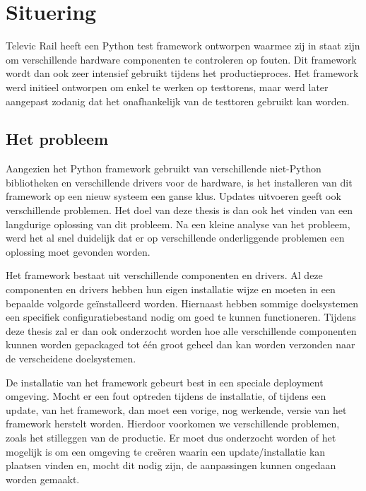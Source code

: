 \chapter{Situering}\label{hfdst:situering}
Televic Rail heeft een Python test framework ontworpen waarmee zij in staat zijn om verschillende hardware componenten te controleren op fouten.
Dit framework wordt dan ook zeer intensief gebruikt tijdens het productieproces.
Het framework werd initieel ontworpen om enkel te werken op testtorens, maar werd later aangepast zodanig dat het onafhankelijk van de testtoren gebruikt kan worden.

\section{Het probleem}\label{sec:probleem}
Aangezien het Python framework gebruikt van verschillende niet-Python bibliotheken en verschillende drivers voor de hardware, is het installeren van dit framework op een nieuw systeem een ganse klus.
Updates uitvoeren geeft ook verschillende problemen.
Het doel van deze thesis is dan ook het vinden van een langdurige oplossing van dit probleem.
Na een kleine analyse van het probleem, werd het al snel duidelijk dat er op verschillende onderliggende problemen een oplossing moet gevonden worden.

Het framework bestaat uit verschillende componenten en drivers.
Al deze componenten en drivers hebben hun eigen installatie wijze en moeten in een bepaalde volgorde geïnstalleerd worden.
Hiernaast hebben sommige doelsystemen een specifiek configuratiebestand nodig om goed te kunnen functioneren.
Tijdens deze thesis zal er dan ook onderzocht worden hoe alle verschillende componenten kunnen worden gepackaged tot één groot geheel dan kan worden verzonden naar de verscheidene doelsystemen.

De installatie van het framework gebeurt best in een speciale deployment omgeving.
Mocht er een fout optreden tijdens de installatie, of tijdens een update, van het framework, dan moet een vorige, nog werkende, versie van het framework herstelt worden.
Hierdoor voorkomen we verschillende problemen, zoals het stilleggen van de productie.
Er moet dus onderzocht worden of het mogelijk is om een omgeving te creëren waarin een update/installatie kan plaatsen vinden en, mocht dit nodig zijn, de aanpassingen kunnen ongedaan worden gemaakt.

